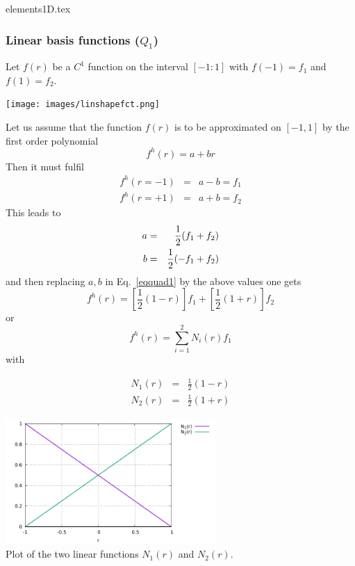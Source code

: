 \begin{flushright} {\tiny {\color{gray} elements1D.tex}} \end{flushright}


\subsubsection{Linear basis functions ($Q_1$) \label{sec:bf1}}

Let $f(r)$ be a $C^1$ function on the interval $[-1:1]$ with $f(-1)=f_1$  and $f(1)=f_2$.
\begin{center}
\texttt{[image: images/linshapefct.png]}
\end{center}
Let us assume that the function $f(r)$ is to be approximated on $[-1,1]$ by the first order polynomial 
\begin{equation}
f^h(r)=a+br \label{eqquad1}
\end{equation}
Then it must fulfil
\begin{eqnarray}
f^h(r=-1)&=&a-b =f_1 \nonumber\\
f^h(r=+1)&=&a+b =f_2 \nonumber
\end{eqnarray}
This leads to  
\begin{eqnarray}
a&=&\frac{1}{2}(f_1+f_2)  \nonumber\\
b&=&\frac{1}{2}(-f_1+f_2)  
\end{eqnarray}
and then replacing $a,b$ in Eq.~\eqref{eqquad1} by the above values one gets
\[
f^h(r) = \left[  \frac{1}{2}(1-r)\right] f_1 + \left[ \frac{1}{2}(1+r) \right] f_2
\]
or
\[
f^h(r)=\sum_{i=1}^2 N_i(r) f_1
\]
with
\begin{mdframed}[backgroundcolor=blue!5]
\begin{eqnarray}
N_1(r) &=& \frac{1}{2} (1-r) \nonumber\\
N_2(r) &=& \frac{1}{2} (1+r)
\end{eqnarray}
\end{mdframed}

\begin{center}
\includegraphics[width=8cm]{images/basis1D/linear.pdf}\\
{\captionfont Plot of the two linear functions $N_1(r)$ and $N_2(r)$.}
\end{center}

